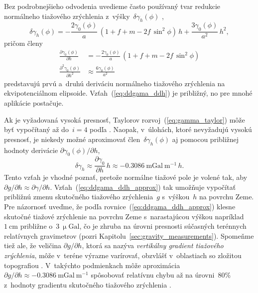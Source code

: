 \documentclass[a4paper, 12pt]{book}
\begin{document}
Bez podrobnejšieho odvodenia uvedieme často používaný tvar redukcie normálneho 
tiažového zrýchlenia z~výšky~$\delta\gamma_h(\phi)$ \parencite[pozri 
napríklad][]{MoritzPhysicalGeodesy},
%
\begin{equation}
\delta\gamma_h(\phi) = -\frac{2\gamma_0(\phi)}{a} \, (1 + f + m - 2f \, 
\sin^2\phi) \, h + \frac{3\gamma_0(\phi)}{a^2} \, h^2{,}
\end{equation}
%
pričom členy
%
\begin{align}
\frac{\partial \gamma_0(\phi)}{\partial h} &= -\frac{2\gamma_0(\phi)}{a} \, (1 
+ f + m - 2f \, \sin^2\phi)\\
%
%
\label{eq:ddgama_ddh}
\frac{\partial^2 \gamma_0(\phi)}{\partial h^2} &\approx 
\frac{6\gamma_0(\phi)}{a^2}
\end{align}
%
predstavujú prvú a~druhú deriváciu normálneho tiažového zrýchlenia na 
ekvipotenciálnom elipsoide.  Vzťah~(\ref{eq:ddgama_ddh}) je približný, no pre 
mnohé aplikácie postačuje.

Ak je vyžadovaná vysoká presnosť, Taylorov rozvoj~(\ref{eq:gamma_taylor}) môže 
byť vypočítaný až do~$i = 4$ podľa \textcite{Pick2000}.  Naopak, v~úlohách, 
ktoré nevyžadujú vysokú presnosť, je niekedy možné aproximovať 
člen~$\delta\gamma_h(\phi)$ aj pomocou približnej hodnoty derivácie $\partial 
\gamma_0(\phi) \slash \partial h$,
%
\begin{equation}
\label{eq:ddgama_ddh_approx}
\delta\gamma_h \approx \frac{\partial \gamma_0}{\partial h} \, h \approx 
-0.3086 \ \mathrm{mGal} \ \mathrm{m}^{-1} \, h{.}
\end{equation}
%
Tento vzťah je vhodné poznať, pretože normálne tiažové pole je volené tak, aby 
$\partial g \slash \partial h \approx \partial \gamma \slash \partial h$.  
Vzťah~(\ref{eq:ddgama_ddh_approx}) tak umožňuje vypočítať približnú zmenu 
skutočného tiažového zrýchlenia~$g$ s~výškou~$h$ na povrchu Zeme.  Pre 
názornosť uveďme, že podľa rovnice~(\ref{eq:ddgama_ddh_approx}) klesne skutočné 
tiažové zrýchlenie na povrchu Zeme s~narastajúcou výškou napríklad~$1 
\ \mathrm{cm}$ približne o~$3 \ \upmu\mathrm{Gal}$, čo je zhruba na úrovni 
presnosti súčasných terénnych relatívnych gravimetrov (pozri 
Kapitolu~\ref{sec:gravity_measurements}).  Spomeňme tiež ale, že veličina 
$\partial g \slash \partial h$, ktorá sa nazýva \emph{vertikálny gradient 
tiažového zrýchlenia}, môže v~teréne výrazne varírovať, obzvlášť v~oblastiach 
so zložitou topografiou \parencite{Zahorec2018}.  V~takýchto podmienkach môže 
aproximácia~$\partial g \slash \partial h \approx -0.3086 \ \mathrm{mGal} 
\ \mathrm{m}^{-1}$ spôsobovať relatívnu chybu až na úrovni~$80 \%$ z~hodnoty 
gradientu skutočného tiažového zrýchlenia \parencite{Vajda2020a}.
\end{document}
